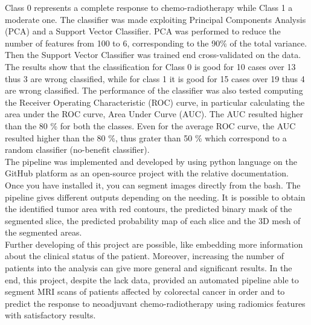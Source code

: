 \documentclass{standalone}
\begin{document}
Class 0 represents a complete response to chemo-radiotherapy while Class 1 a moderate one.
The classifier was made exploiting Principal Components Analysis (PCA) and a Support Vector Classifier.
PCA was performed to reduce the number of features from 100 to 6, corresponding to the 90\% of the total variance.
Then the Support Vector Classifier was trained end cross-validated on the data.
The results show that the classification for Class 0 is good for 10 cases over 13 thus 3 are wrong classified, while for class 1 it is good for 15 cases over 19 thus 4 are wrong classified.
The performance of the classifier was also tested computing the Receiver Operating Characteristic (ROC) curve, in particular calculating the area under the ROC curve, Area Under Curve (AUC).
The AUC resulted higher than the 80 \% for both the classes. 
Even for the average ROC curve, the AUC resulted higher than the 80 \%, thus grater than 50 \% which correspond to a random classifier (no-benefit classifier).
\\
The pipeline was implemented and developed by using python language on the GitHub platform as an open-source project with the relative documentation.
Once you have installed it, you can segment images directly from the bash.
The pipeline gives different outputs depending on the needing.
It is possible to obtain the identified tumor area with red contours, the predicted binary mask of the segmented slice, the predicted probability map of each slice and the 3D mesh  of the segmented areas.
\\
Further developing of this project are possible, like embedding more information about the clinical status of the patient. Moreover, increasing the number of patients into the analysis can give more general and significant results.
In the end, this project, despite the lack data, provided an automated pipeline able to segment MRI scans
of patients affected by colorectal cancer in order and to predict the response to neoadjuvant chemo-radiotherapy
using radiomics features with satisfactory results.
\end{document}
